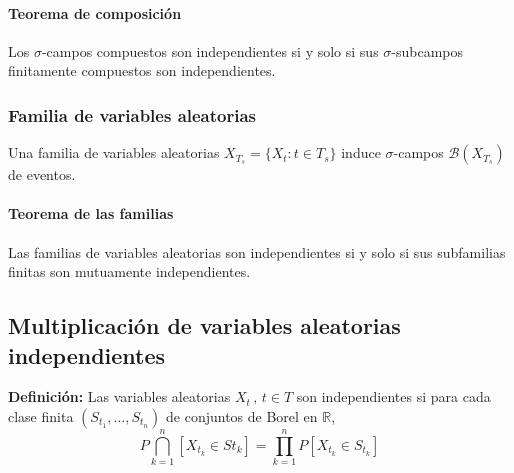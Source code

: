 \paragraph{Teorema de composición}
\begin{theorem}
Los $\sigma$-campos compuestos son independientes si y solo si sus $\sigma$-subcampos finitamente compuestos son independientes.
\end{theorem}
\subsubsection{Familia de variables aleatorias}
Una familia de variables aleatorias $X_{T_s}=\{ X_t : t\in T_s \}$ induce $\sigma$-campos $\mathcal{B}(X_{T_s})$ de eventos.
\paragraph{Teorema de las familias}
\begin{theorem}
Las familias de variables aleatorias son independientes si y solo si sus subfamilias finitas son mutuamente independientes.
\end{theorem}
\subsection{Multiplicación de variables aleatorias independientes}
\textbf{Definición: } Las variables aleatorias $X_t\, , \, t\in T$ son independientes si para cada clase finita $(S_{t_1},\ldots , S_{t_n})$ de conjuntos de Borel en $\mathbb{R}$,
$$P\bigcap_{k=1}^{n}[X_{t_k}\in S{t_k}]=\displaystyle\prod_{k=1}^n P[X_{t_k}\in S_{t_k}]$$

